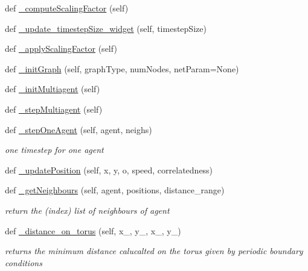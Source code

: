 \begin{DoxyCompactItemize}
def \hyperlink{class_mu_mo_t_1_1_mu_mo_t_1_1_mu_mo_tmultiagent_view_a064b5783c9e87092a7059fb632b56585}{\+\_\+compute\+Scaling\+Factor} (self)
\item 
def \hyperlink{class_mu_mo_t_1_1_mu_mo_t_1_1_mu_mo_tmultiagent_view_a5e541babe7e44e6888eb0ba92460cae2}{\+\_\+update\+\_\+timestep\+Size\+\_\+widget} (self, timestep\+Size)
\item 
def \hyperlink{class_mu_mo_t_1_1_mu_mo_t_1_1_mu_mo_tmultiagent_view_acc41eb1ddfc93fea7e67aa85c9d7f6fc}{\+\_\+apply\+Scaling\+Factor} (self)
\item 
def \hyperlink{class_mu_mo_t_1_1_mu_mo_t_1_1_mu_mo_tmultiagent_view_a0d226d5fb0e02291c96e1ff63a08047e}{\+\_\+init\+Graph} (self, graph\+Type, num\+Nodes, net\+Param=None)
\item 
def \hyperlink{class_mu_mo_t_1_1_mu_mo_t_1_1_mu_mo_tmultiagent_view_a4b9b689b183e0a18c7f60e48b6beafef}{\+\_\+init\+Multiagent} (self)
\item 
def \hyperlink{class_mu_mo_t_1_1_mu_mo_t_1_1_mu_mo_tmultiagent_view_a80b7d1f8c2f44ea9f4154b79f0baacfb}{\+\_\+step\+Multiagent} (self)
\item 
def \hyperlink{class_mu_mo_t_1_1_mu_mo_t_1_1_mu_mo_tmultiagent_view_a87f5913cd055f8e4eaa70b058ad7d77b}{\+\_\+step\+One\+Agent} (self, agent, neighs)
\begin{DoxyCompactList}\small\item\em one timestep for one agent \end{DoxyCompactList}\item 
def \hyperlink{class_mu_mo_t_1_1_mu_mo_t_1_1_mu_mo_tmultiagent_view_aba4da96cc2e7682af895cda4b1310790}{\+\_\+update\+Position} (self, x, y, o, speed, correlatedness)
\item 
def \hyperlink{class_mu_mo_t_1_1_mu_mo_t_1_1_mu_mo_tmultiagent_view_ad3df4b96d9dec10c8b806eb6697c6028}{\+\_\+get\+Neighbours} (self, agent, positions, distance\+\_\+range)
\begin{DoxyCompactList}\small\item\em return the (index) list of neighbours of \textquotesingle{}agent\textquotesingle{} \end{DoxyCompactList}\item 
def \hyperlink{class_mu_mo_t_1_1_mu_mo_t_1_1_mu_mo_tmultiagent_view_aa88fd0656cfcc7c9671c2bcc61d7726e}{\+\_\+distance\+\_\+on\+\_\+torus} (self, x\+\_, y\+\_, x\+\_, y\+\_)
\begin{DoxyCompactList}\small\item\em returns the minimum distance calucalted on the torus given by periodic boundary conditions \end{DoxyCompactList}\end{DoxyCompactItemize}
